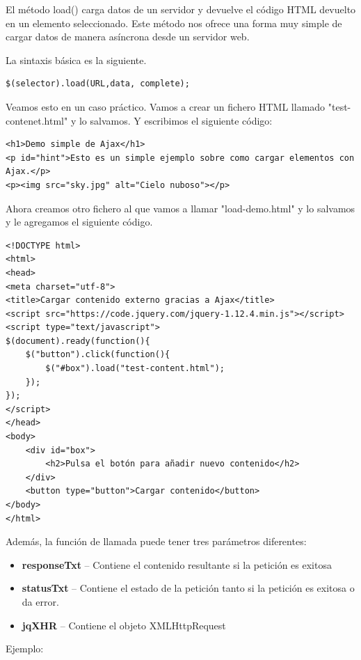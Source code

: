 \documentclass[a4paper, oneside]{article}
\begin{document}
El método load() carga datos de un servidor y devuelve el código HTML devuelto en un elemento seleccionado. Este método nos ofrece una forma muy simple de cargar datos de manera asíncrona desde un servidor web. 

La sintaxis básica es la siguiente.

\begin{verbatim}
$(selector).load(URL,data, complete);
\end{verbatim}

Veamos esto en un caso práctico. Vamos a crear un fichero HTML llamado "test-contenet.html" y lo salvamos. Y escribimos el siguiente código:

\begin{verbatim}
<h1>Demo simple de Ajax</h1>
<p id="hint">Esto es un simple ejemplo sobre como cargar elementos con Ajax.</p>
<p><img src="sky.jpg" alt="Cielo nuboso"></p>
\end{verbatim}

Ahora creamos otro fichero al que vamos a llamar "load-demo.html" y lo salvamos y le agregamos el siguiente código.

\begin{verbatim}
<!DOCTYPE html>
<html>
<head>
<meta charset="utf-8">
<title>Cargar contenido externo gracias a Ajax</title>
<script src="https://code.jquery.com/jquery-1.12.4.min.js"></script>
<script type="text/javascript">
$(document).ready(function(){
    $("button").click(function(){
        $("#box").load("test-content.html");
    });
});
</script>
</head>
<body>
    <div id="box">
        <h2>Pulsa el botón para añadir nuevo contenido</h2>
    </div>
    <button type="button">Cargar contenido</button>
</body>
</html>                                		
\end{verbatim}


Además, la función de llamada puede tener tres parámetros diferentes:

\begin{itemize}
\item \textbf{responseTxt} -- Contiene el contenido resultante si la petición es exitosa
\item \textbf{statusTxt} -- Contiene el estado de la petición tanto si la petición es exitosa o da error.
\item \textbf{jqXHR} -- Contiene el objeto XMLHttpRequest
\end{itemize}

Ejemplo:
\end{document}
